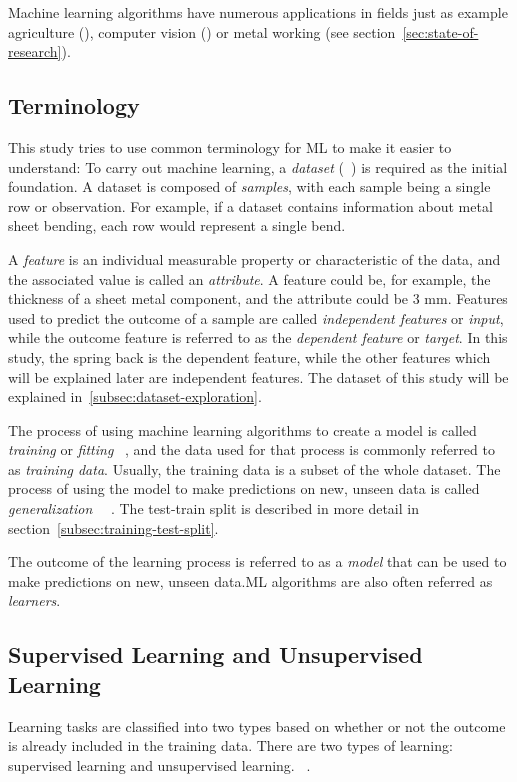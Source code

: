 Machine learning algorithms have numerous applications in fields just as example
agriculture (\cite{yoosefzadeh2021application}), computer vision (\cite{hu2020voronoi}) or metal working
(see section~\ref{sec:state-of-research}).

\subsection{Terminology}\label{subsec:terminology}
This study tries to use common terminology for \ac{ML} to make it easier to understand:
To carry out machine learning, a \textit{dataset} (~\cite[p. 3]{zhou_machinelearning_2021}) is required as the
initial foundation.
A dataset is composed of \textit{samples}, with each sample being a single row or observation.
For example, if a dataset contains information about metal sheet bending, each row would represent a single bend.

A \textit{feature} is an individual measurable property or characteristic of the data, and the associated value is
called an \textit{attribute}.
A feature could be, for example, the thickness of a sheet metal component, and the attribute could be 3 mm.
Features used to predict the outcome of a sample are called \textit{independent features} or \textit{input}, while the
outcome feature is referred to as the \textit{dependent feature} or \textit{target}.
In this study, the spring back is the dependent feature, while the other features which will be explained later are
independent features.
The dataset of this study will be explained in~\cref{subsec:dataset-exploration}.

The process of using machine learning algorithms to create a model is called \textit{training} or \textit{fitting}
~\cite[p. 4]{el2015machine}, and the data used for that process is commonly referred to as \textit{training data}.
Usually, the training data is a subset of the whole dataset.
The process of using the model to make predictions on new, unseen data is called
\textit{generalization}
~\cite[pp. 26--27]{muller_introductionmachinelearning_2016}~\cite[p. 4]{zhou_machinelearning_2021}.
The test-train split is described in more detail in section~\ref{subsec:training-test-split}.

The outcome of the learning process is referred to as a \textit{model} that can be used to make predictions on new,
unseen data.\ac{ML} algorithms are also often referred as \textit{learners}.

\subsection{Supervised Learning and Unsupervised Learning}\label{subsec:supervised-learning}
Learning tasks are classified into two types based on whether or not the outcome is already included in the training
data.
There are two types of learning: supervised learning and unsupervised learning.
~\cite[p. 4]{zhou_machinelearning_2021}.


